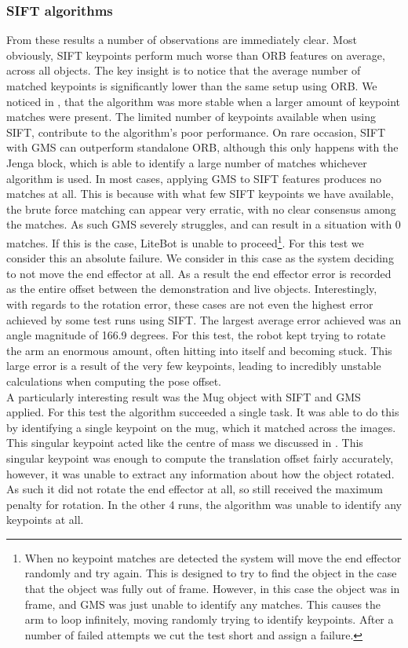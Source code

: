 \subsubsection{SIFT algorithms}
From these results a number of observations are immediately clear. Most obviously, SIFT keypoints perform much worse than ORB features on average, across all objects. The key insight is to notice that the average number of matched keypoints is significantly lower than the same setup using ORB. We noticed in , that the algorithm was more stable when a larger amount of keypoint matches were present. The limited number of keypoints available when using SIFT, contribute to the algorithm's poor performance. On rare occasion, SIFT with GMS can outperform standalone ORB, although this only happens with the Jenga block, which is able to identify a large number of matches whichever algorithm is used. In most cases, applying GMS to SIFT features produces no matches at all. This is because with what few SIFT keypoints we have available, the brute force matching can appear very erratic, with no clear consensus among the matches. As such GMS severely struggles, and can result in a situation with 0 matches. If this is the case, LiteBot is unable to proceed\footnote{When no keypoint matches are detected the system will move the end effector randomly and try again. This is designed to try to find the object in the case that the object was fully out of frame. However, in this case the object was in frame, and GMS was just unable to identify any matches. This causes the arm to loop infinitely, moving randomly trying to identify keypoints. After a number of failed attempts we cut the test short and assign a failure.}. For this test we consider this an absolute failure. We consider in this case as the system deciding to not move the end effector at all. As a result the end effector error is recorded as the entire offset between the demonstration and live objects. Interestingly, with regards to the rotation error, these cases are not even the highest error achieved by some test runs using SIFT. The largest average error achieved was an angle magnitude of 166.9 degrees. For this test, the robot kept trying to rotate the arm an enormous amount, often hitting into itself and becoming stuck. This large error is a result of the very few keypoints, leading to incredibly unstable calculations when computing the pose offset.\\

A particularly interesting result was the Mug object with SIFT and GMS applied. For this test the algorithm succeeded a single task. It was able to do this by identifying a single keypoint on the mug, which it matched across the images. This singular keypoint acted like the centre of mass we discussed in . This singular keypoint was enough to compute the translation offset fairly accurately, however, it was unable to extract any information about how the object rotated. As such it did not rotate the end effector at all, so still received the maximum penalty for rotation. In the other 4 runs, the algorithm was unable to identify any keypoints at all.\\

